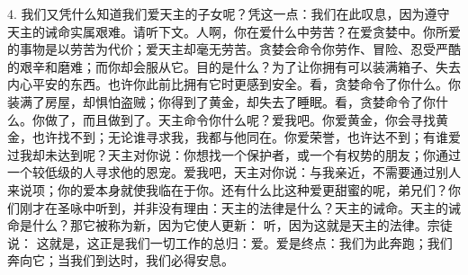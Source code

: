 4. 我们又凭什么知道我们爱天主的子女呢？凭这一点：我们在此叹息，因为遵守天主的诫命实属艰难。请听下文。人啊，你在爱什么中劳苦？在爱贪婪中。你所爱的事物是以劳苦为代价；爱天主却毫无劳苦。贪婪会命令你劳作、冒险、忍受严酷的艰辛和磨难；而你却会服从它。目的是什么？为了让你拥有可以装满箱子、失去内心平安的东西。也许你此前比拥有它时更感到安全。看，贪婪命令了你什么。你装满了房屋，却惧怕盗贼；你得到了黄金，却失去了睡眠。看，贪婪命令了你什么。你做了，而且做到了。天主命令你什么呢？爱我吧。你爱黄金，你会寻找黄金，也许找不到；无论谁寻求我，我都与他同在。你爱荣誉，也许达不到；有谁爱过我却未达到呢？天主对你说：你想找一个保护者，或一个有权势的朋友；你通过一个较低级的人寻求他的恩宠。爱我吧，天主对你说：与我亲近，不需要通过别人来说项；你的爱本身就使我临在于你。还有什么比这种爱更甜蜜的呢，弟兄们？你们刚才在圣咏中听到，并非没有理由：天主的法律是什么？天主的诫命。天主的诫命是什么？那它被称为新，因为它使人更新： 听，因为这就是天主的法律。宗徒说： 这就是，这正是我们一切工作的总归：爱。爱是终点：我们为此奔跑；我们奔向它；当我们到达时，我们必得安息。\par

